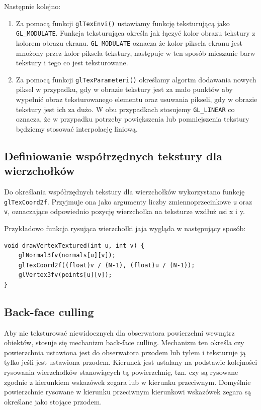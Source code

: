 \documentclass[a4paper]{article}
\begin{document}
Następnie kolejno:

\begin{enumerate}
    \item Za pomocą funkcji \verb|glTexEnvi()| ustawiamy funkcję teksturującą
          jako \verb|GL_MODULATE|. Funkcja teksturująca określa jak łączyć kolor
          obrazu tekstury z kolorem obrazu ekranu. \verb|GL_MODULATE| oznacza że
          kolor piksela ekranu jest mnożony przez kolor piksela tekstury,
          następuje w ten sposób mieszanie barw tekstury i tego co jest
          teksturowane.

    \item Za pomocą funkcji \verb|glTexParameteri()| określamy algortm dodawania
          nowych piksel w przypadku, gdy w obrazie tekstury jest za mało punktów
          aby wypełnić obraz teksturowanego elementu oraz usuwania pikseli, gdy
          w obrazie tekstury jest ich za dużo. W obu przypadkach stosujemy
          \verb|GL_LINEAR| co oznacza, że w przypadku potrzeby powiększenia lub
          pomniejszenia tekstury będziemy stosować interpolację liniową.
\end{enumerate}

\subsection{Definiowanie współrzędnych tekstury dla wierzchołków}

Do określania współrzędnych tekstury dla wierzchołków wykorzystano funkcję
\verb|glTexCoord2f|. Przyjmuje ona jako argumenty liczby zmiennoprzecinkowe
\verb|u| oraz \verb|v|, oznaczające odpowiednio pozycję wierzchołka na teksturze
wzdłuż osi x i y.

Przykładowo funkcja rysująca wierzchołki jaja wygląda w następujący sposób:

\begin{verbatim}
void drawVertexTextured(int u, int v) {
    glNormal3fv(normals[u][v]);
    glTexCoord2f((float)v / (N-1), (float)u / (N-1));
    glVertex3fv(points[u][v]);
}
\end{verbatim}

\subsection{Back-face culling}

Aby nie teksturować niewidocznych dla obserwatora powierzchni wewnątrz obiektów,
stosuje się mechanizm back-face culling. Mechanizm ten określa czy powierzchnia
ustawiona jest do obserwatora przodem lub tyłem i teksturuje ją tylko jeśli jest
ustawiona przodem. Kierunek jest ustalany na podstawie kolejności rysowania
wierzchołków stanowiących tą powierzchnię, tzn. czy są rysowane zgodnie z
kierunkiem wskazówek zegara lub w kierunku przeciwnym. Domyślnie powierzchnie
rysowane w kierunku przeciwnym kierunkowi wskazówek zegara są określane jako
stojące przodem.
\end{document}
